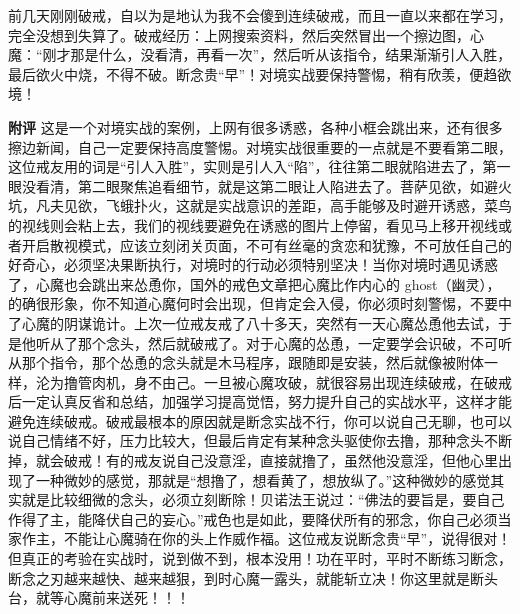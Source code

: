 \begin{case}
    前几天刚刚破戒，自以为是地认为我不会傻到连续破戒，而且一直以来都在学习，完全没想到失算了。破戒经历：上网搜索资料，然后突然冒出一个擦边图，心魔：“刚才那是什么，没看清，再看一次”，然后听从该指令，结果渐渐引人入胜，最后欲火中烧，不得不破。断念贵“早”！对境实战要保持警惕，稍有欣羡，便趋欲境！

    \textbf{附评} 这是一个对境实战的案例，上网有很多诱惑，各种小框会跳出来，还有很多擦边新闻，自己一定要保持高度警惕。对境实战很重要的一点就是不要看第二眼，这位戒友用的词是“引人入胜”，实则是引人入“陷”，往往第二眼就陷进去了，第一眼没看清，第二眼聚焦追看细节，就是这第二眼让人陷进去了。菩萨见欲，如避火坑，凡夫见欲，飞蛾扑火，这就是实战意识的差距，高手能够及时避开诱惑，菜鸟的视线则会粘上去，我们的视线要避免在诱惑的图片上停留，看见马上移开视线或者开启散视模式，应该立刻闭关页面，不可有丝毫的贪恋和犹豫，不可放任自己的好奇心，必须坚决果断执行，对境时的行动必须特别坚决！当你对境时遇见诱惑了，心魔也会跳出来怂恿你，国外的戒色文章把心魔比作内心的 ghost（幽灵），的确很形象，你不知道心魔何时会出现，但肯定会入侵，你必须时刻警惕，不要中了心魔的阴谋诡计。上次一位戒友戒了八十多天，突然有一天心魔怂恿他去试，于是他听从了那个念头，然后就破戒了。对于心魔的怂恿，一定要学会识破，不可听从那个指令，那个怂恿的念头就是木马程序，跟随即是安装，然后就像被附体一样，沦为撸管肉机，身不由己。一旦被心魔攻破，就很容易出现连续破戒，在破戒后一定认真反省和总结，加强学习提高觉悟，努力提升自己的实战水平，这样才能避免连续破戒。破戒最根本的原因就是断念实战不行，你可以说自己无聊，也可以说自己情绪不好，压力比较大，但最后肯定有某种念头驱使你去撸，那种念头不断掉，就会破戒！有的戒友说自己没意淫，直接就撸了，虽然他没意淫，但他心里出现了一种微妙的感觉，那就是“想撸了，想看黄了，想放纵了。”这种微妙的感觉其实就是比较细微的念头，必须立刻断除！贝诺法王说过：“佛法的要旨是，要自己作得了主，能降伏自己的妄心。”戒色也是如此，要降伏所有的邪念，你自己必须当家作主，不能让心魔骑在你的头上作威作福。这位戒友说断念贵“早”，说得很对！但真正的考验在实战时，说到做不到，根本没用！功在平时，平时不断练习断念，断念之刃越来越快、越来越狠，到时心魔一露头，就能斩立决！你这里就是断头台，就等心魔前来送死！！！
\end{case}

